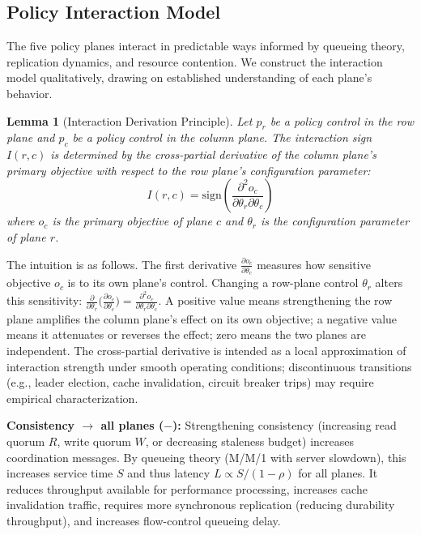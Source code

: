 \documentclass[conference]{IEEEtran}
\newtheorem{lemma}[theorem]{Lemma}
\begin{document}
\subsection{Policy Interaction Model}

The five policy planes interact in predictable ways informed by queueing theory, replication dynamics, and resource contention. We construct the interaction model qualitatively, drawing on established understanding of each plane's behavior.

\begin{lemma}[Interaction Derivation Principle]
Let $p_r$ be a policy control in the row plane and $p_c$ be a policy control in the column plane. The interaction sign $I(r,c)$ is determined by the cross-partial derivative of the column plane's primary objective with respect to the row plane's configuration parameter:
$$I(r,c) = \text{sign}\left(\frac{\partial^2 o_c}{\partial \theta_r \partial \theta_c}\right)$$
where $o_c$ is the primary objective of plane $c$ and $\theta_r$ is the configuration parameter of plane $r$.
\end{lemma}

The intuition is as follows. The first derivative $\frac{\partial o_c}{\partial \theta_c}$ measures how sensitive objective $o_c$ is to its own plane's control. Changing a row-plane control $\theta_r$ alters this sensitivity: $\frac{\partial}{\partial \theta_r}\bigl(\frac{\partial o_c}{\partial \theta_c}\bigr) = \frac{\partial^2 o_c}{\partial \theta_r \partial \theta_c}$. A positive value means strengthening the row plane amplifies the column plane's effect on its own objective; a negative value means it attenuates or reverses the effect; zero means the two planes are independent. The cross-partial derivative is intended as a local approximation of interaction strength under smooth operating conditions; discontinuous transitions (e.g., leader election, cache invalidation, circuit breaker trips) may require empirical characterization.

\textbf{Consistency $\to$ all planes ($-$):} Strengthening consistency (increasing read quorum $R$, write quorum $W$, or decreasing staleness budget) increases coordination messages. By queueing theory (M/M/1 with server slowdown), this increases service time $S$ and thus latency $L \propto S/(1-\rho)$ for all planes. It reduces throughput available for performance processing, increases cache invalidation traffic, requires more synchronous replication (reducing durability throughput), and increases flow-control queueing delay.
\end{document}
